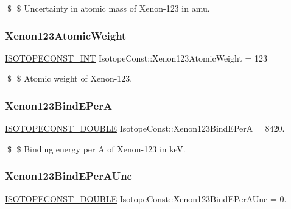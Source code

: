 \$ \$ Uncertainty in atomic mass of Xenon-\/123 in amu. \mbox{\label{group___isotope_const-_xenon-_xe123_ga230723dfaea90cbfc9db8bc2efbee949}} 
\subsubsection{\texorpdfstring{Xenon123\+Atomic\+Weight}{Xenon123AtomicWeight}}
{\footnotesize\ttfamily \mbox{\hyperlink{group___isotope_const-_macros_ga5f18360b3e99483a35c32d789e62621c}{I\+S\+O\+T\+O\+P\+E\+C\+O\+N\+S\+T\+\_\+\+I\+NT}} Isotope\+Const\+::\+Xenon123\+Atomic\+Weight = 123}

\$ \$ Atomic weight of Xenon-\/123. \mbox{\label{group___isotope_const-_xenon-_xe123_gaed9208d9ffc5a50a7cf2527b0910eed9}} 
\subsubsection{\texorpdfstring{Xenon123\+Bind\+E\+PerA}{Xenon123BindEPerA}}
{\footnotesize\ttfamily \mbox{\hyperlink{group___isotope_const-_macros_ga8f45a7272ce02c0b4c65c44636ed719a}{I\+S\+O\+T\+O\+P\+E\+C\+O\+N\+S\+T\+\_\+\+D\+O\+U\+B\+LE}} Isotope\+Const\+::\+Xenon123\+Bind\+E\+PerA = 8420.}

\$ \$ Binding energy per A of Xenon-\/123 in keV. \mbox{\label{group___isotope_const-_xenon-_xe123_ga5f1eeaec7e76a6b6cc3cfed240f4936e}} 
\subsubsection{\texorpdfstring{Xenon123\+Bind\+E\+Per\+A\+Unc}{Xenon123BindEPerAUnc}}
{\footnotesize\ttfamily \mbox{\hyperlink{group___isotope_const-_macros_ga8f45a7272ce02c0b4c65c44636ed719a}{I\+S\+O\+T\+O\+P\+E\+C\+O\+N\+S\+T\+\_\+\+D\+O\+U\+B\+LE}} Isotope\+Const\+::\+Xenon123\+Bind\+E\+Per\+A\+Unc = 0.}

